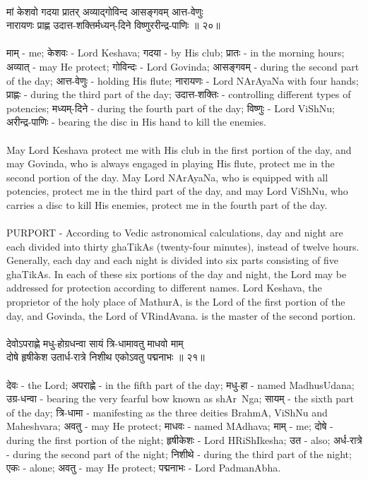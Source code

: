 \\ 
मां केशवो गदया प्रातर् अव्याद्गोविन्द आसङ्गवम् आत्त-वेणुः\\
नारायणः प्राह्ण उदात्त-शक्तिर्मध्यन्-दिने विष्णुररीन्द्र-पाणिः ॥ २०॥\\
\\
माम् - me;  केशवः - Lord Keshava;  गदया - by His club;  प्रातः - in the morning hours;  अव्यात् - may He protect;  गोविन्दः - Lord Govinda; आसङ्गवम् - during the second part of the day;  आत्त-वेणुः - holding His flute;  नारायणः - Lord NArAyaNa with four hands;  प्राह्णः - during the third part of the day;  उदात्त-शक्तिः -  controlling different types of potencies;  मध्यम्-दिने - during the fourth part of the day;  विष्णुः - Lord ViShNu; अरीन्द्र-पाणिः - bearing the disc in His hand to kill the enemies.\\
\\
May Lord Keshava protect me with His club in the first portion of the day, and may Govinda, who is always engaged in playing His flute, protect me in the second portion of the day. May Lord NArAyaNa, who is equipped with all potencies, protect me in the third part of the day, and may Lord ViShNu, who carries a disc to kill His enemies, protect me in the fourth part of the day.\\
\\
PURPORT - According to Vedic astronomical calculations, day and night are each divided into thirty ghaTikAs (twenty-four minutes), instead of twelve hours. Generally, each day and each night is divided into six parts consisting of five ghaTikAs. In each of these six portions of the day and night, the Lord may be addressed for protection according to different names. Lord Keshava, the proprietor of the holy place of MathurA, is the Lord of the first portion of the day, and Govinda, the Lord of VRindAvana. is the master of the second portion.\\
\\ 
देवोऽपराह्णे मधु-होग्रधन्वा सायं त्रि-धामावतु माधवो माम्\\
दोषे हृषीकेश उतार्ध-रात्रे निशीथ एकोऽवतु पद्मनाभः ॥ २१॥\\
\\
देवः - the Lord;  अपराह्णे - in the fifth part of the day;  मधु-हा - named MadhusUdana;  उग्र-धन्वा - bearing the very fearful bow known as shAr~Nga;  सायम् - the sixth part of the day;  त्रि-धामा - manifesting as the three deities BrahmA, ViShNu and Maheshvara;  अवतु - may He protect;  माधवः - named MAdhava;  माम् - me;  दोषे - during the first portion of the night;  हृषीकेशः - Lord HRiShIkesha;  उत - also; अर्ध-रात्रे - during the second part of the night;  निशीथे - during the third part of the night;  एकः - alone;  अवतु -  may He protect;  पद्मनाभः - Lord PadmanAbha.\\
